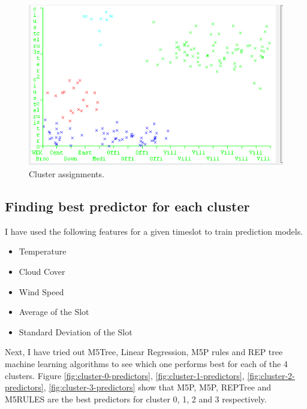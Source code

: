 \begin{figure}[h!]
  \includegraphics[width=\linewidth]{4-cluster-with-10-files.png}
  \caption{Cluster assignments.}
  \label{fig:4-cluster-with-10-files}
\end{figure}

\subsection {Finding best predictor for each cluster}
I have used the following features for a given timeslot to train prediction models. 
 
\begin{itemize}
  \item Temperature
  \item Cloud Cover
  \item Wind Speed
  \item Average of the Slot
  \item Standard Deviation of the Slot
\end{itemize}

Next, I have tried out  M5Tree, Linear Regression, M5P rules and REP tree machine learning algorithms to see which one performs best for each of the 4 clusters. Figure \ref{fig:cluster-0-predictors}, \ref{fig:cluster-1-predictors}, \ref{fig:cluster-2-predictors}, \ref{fig:cluster-3-predictors} show that M5P, M5P, REPTree and M5RULES are the best predictors for cluster 0, 1, 2 and 3 respectively.

